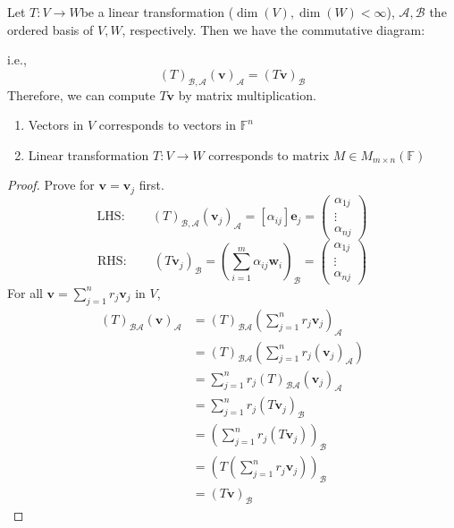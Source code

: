 \begin{theorem}
Let $T:V\to W$be a linear transformation ($\dim(V),\dim(W)<\infty$), $\mathcal{A},\mathcal{B}$ the ordered basis of $V,W$, respectively.
Then we have the commutative diagram:

i.e., 
\[
(T)_{\mathcal{B},\mathcal{A}}(\bm v)_{\mathcal{A}}
=
(T\bm v)_{\mathcal{B}}
\]
Therefore, we can compute $T\bm v$ by matrix multiplication.
\end{theorem}
\begin{remark}
\begin{enumerate}
\item
Vectors in $V$ corresponds to vectors in $\mathbb{F}^n$
\item
Linear transformation $T:V\to W$ corresponds to matrix $M\in M_{m\times n}(\mathbb{F})$
\end{enumerate}
\end{remark}

\begin{proof}
Prove for $\bm v=\bm v_j$ first.
\[
\text{LHS}:\qquad
(T)_{\mathcal{B},\mathcal{A}}(\bm v_j)_{\mathcal{A}}=[\alpha_{ij}]\bm e_j=\begin{pmatrix}
\alpha_{1j}\\\vdots\\\alpha_{nj}
\end{pmatrix}
\]
\[
\text{RHS}:\qquad
(T\bm v_j)_{\mathcal{B}}
=
\left(
\sum_{i=1}^m\alpha_{ij}\bm w_i
\right)_{\mathcal{B}}
=\begin{pmatrix}
\alpha_{1j}\\\vdots\\\alpha_{nj}
\end{pmatrix}
\]
For all $\bm v=\sum_{j=1}^nr_j\bm v_j$ in $V$,
\begin{align*}
(T)_{\mathcal{B}\mathcal{A}}(\bm v)_{\mathcal{A}}
&=
(T)_{\mathcal{B}\mathcal{A}}(\sum_{j=1}^nr_j\bm v_j)_{\mathcal{A}}\\
&=
(T)_{\mathcal{B}\mathcal{A}}(\sum_{j=1}^nr_j(\bm v_j)_{\mathcal{A}})\\
&=
\sum_{j=1}^nr_j(T)_{\mathcal{B}\mathcal{A}}(\bm v_j)_{\mathcal{A}}\\
&=
\sum_{j=1}^nr_j(T\bm v_j)_{\mathcal{B}}\\
&=(\sum_{j=1}^nr_j(T\bm v_j))_{\mathcal{B}}\\
&=(T(\sum_{j=1}^nr_j\bm v_j))_{\mathcal{B}}\\
&=(T\bm v)_{\mathcal{B}}
\end{align*}



\end{proof}

